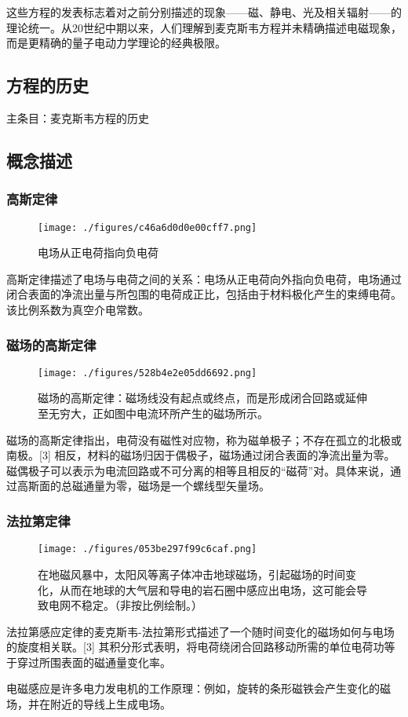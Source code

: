 这些方程的发表标志着对之前分别描述的现象——磁、静电、光及相关辐射——的理论统一。从20世纪中期以来，人们理解到麦克斯韦方程并未精确描述电磁现象，而是更精确的量子电动力学理论的经典极限。
\subsection{方程的历史}  
主条目：麦克斯韦方程的历史
\subsection{概念描述} 
\subsubsection{高斯定律} 
\begin{figure}[ht]
\centering
\texttt{[image: ./figures/c46a6d0d0e00cff7.png]}
\caption{电场从正电荷指向负电荷} \label{fig_MAXS_2}
\end{figure}
高斯定律描述了电场与电荷之间的关系：电场从正电荷向外指向负电荷，电场通过闭合表面的净流出量与所包围的电荷成正比，包括由于材料极化产生的束缚电荷。该比例系数为真空介电常数。
\subsubsection{磁场的高斯定律}
\begin{figure}[ht]
\centering
\texttt{[image: ./figures/528b4e2e05dd6692.png]}
\caption{磁场的高斯定律：磁场线没有起点或终点，而是形成闭合回路或延伸至无穷大，正如图中电流环所产生的磁场所示。} \label{fig_MAXS_3}
\end{figure}
磁场的高斯定律指出，电荷没有磁性对应物，称为磁单极子；不存在孤立的北极或南极。[3] 相反，材料的磁场归因于偶极子，磁场通过闭合表面的净流出量为零。磁偶极子可以表示为电流回路或不可分离的相等且相反的“磁荷”对。具体来说，通过高斯面的总磁通量为零，磁场是一个螺线型矢量场。
\subsubsection{法拉第定律}
\begin{figure}[ht]
\centering
\texttt{[image: ./figures/053be297f99c6caf.png]}
\caption{在地磁风暴中，太阳风等离子体冲击地球磁场，引起磁场的时间变化，从而在地球的大气层和导电的岩石圈中感应出电场，这可能会导致电网不稳定。（非按比例绘制。）} \label{fig_MAXS_4}
\end{figure}
法拉第感应定律的麦克斯韦-法拉第形式描述了一个随时间变化的磁场如何与电场的旋度相关联。[3] 其积分形式表明，将电荷绕闭合回路移动所需的单位电荷功等于穿过所围表面的磁通量变化率。

电磁感应是许多电力发电机的工作原理：例如，旋转的条形磁铁会产生变化的磁场，并在附近的导线上生成电场。